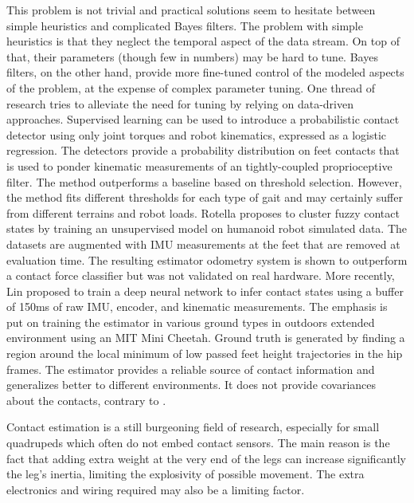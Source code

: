 This problem is not trivial and practical solutions seem to hesitate between simple heuristics and complicated Bayes filters. 
The problem with simple heuristics is that they neglect the temporal aspect of the data stream. On top of that, their parameters (though few in numbers) may be hard to tune.
Bayes filters, on the other hand, provide more fine-tuned control of the modeled aspects of the problem, at the expense of complex parameter tuning.
One thread of research tries to alleviate the need for tuning by relying on data-driven approaches. Supervised learning can be used \cite{camurri2017probabilistic} 
to introduce a probabilistic contact detector using only joint torques and robot kinematics, expressed as a logistic regression. 
The detectors provide a probability distribution on feet contacts that is used to ponder kinematic measurements of an tightly-coupled proprioceptive filter. 
The method outperforms a baseline based on threshold selection. However, the method %
fits different thresholds for each type of gait and may certainly suffer from different terrains and robot loads. 
Rotella \cite{rotella2018unsupervised} proposes to cluster fuzzy contact states by training an unsupervised model on humanoid robot simulated data. The datasets are augmented
with IMU measurements at the feet that are removed at evaluation time. The resulting estimator odometry system is shown to outperform a contact force classifier
but was not validated on real hardware. More recently, Lin \cite{lin2021deep} proposed to train a deep neural network to infer contact states using a buffer of 150ms of raw IMU, 
encoder, and kinematic measurements. The emphasis is put on training the estimator in various ground types in outdoors extended environment using an MIT Mini Cheetah. Ground truth is generated
by finding a region around the local minimum of low passed feet height trajectories in the hip frames. The estimator provides a reliable source of contact information 
and generalizes better to different environments. It does not provide covariances about the contacts, contrary to \cite{camurri2017probabilistic}.  

Contact estimation is a still burgeoning field of research, especially for small quadrupeds which often do not embed contact sensors. The main reason 
is the fact that adding extra weight at the very end of the legs can increase significantly the leg's inertia, limiting the explosivity of possible movement. The 
extra electronics and wiring required may also be a limiting factor.  


